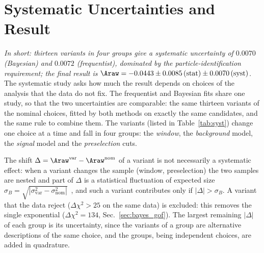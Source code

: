 \section{Systematic Uncertainties and Result}
\label{sec:syst}
\emph{In short: thirteen variants in four groups give a systematic uncertainty of $0.0070$ (Bayesian) and $0.0072$ (frequentist), dominated by the particle-identification requirement; the final result is $\Araw=-0.0443\pm0.0085\,(\text{stat})\pm0.0070\,(\text{syst})$.}
The systematic study asks how much the result depends on choices of the analysis that the data do not fix. The frequentist and Bayesian fits share one study, so that the two uncertainties are comparable: the same thirteen variants of the nominal choices, fitted by both methods on exactly the same candidates, and the same rule to combine them. The variants (listed in Table~\ref{tab:syst}) change one choice at a time and fall in four groups: the \emph{window}, the \emph{background} model, the \emph{signal} model and the \emph{preselection} cuts.

The shift $\Delta=\Araw^{\mathrm{var}}-\Araw^{\mathrm{nom}}$ of a variant is not necessarily a systematic effect: when a variant changes the sample (window, preselection) the two samples are nested and part of $\Delta$ is a statistical fluctuation of expected size $\sigma_B=\sqrt{|\sigma_{\mathrm{var}}^2-\sigma_{\mathrm{nom}}^2|}$~\cite{barlow}, and such a variant contributes only if $|\Delta|>\sigma_B$. A variant that the data reject ($\Delta\chi^2>25$ on the same data) is excluded: this removes the single exponential ($\Delta\chi^2=134$, Sec.~\ref{sec:bayes_gof}). The largest remaining $|\Delta|$ of each group is its uncertainty, since the variants of a group are alternative descriptions of the same choice, and the groups, being independent choices, are added in quadrature.

